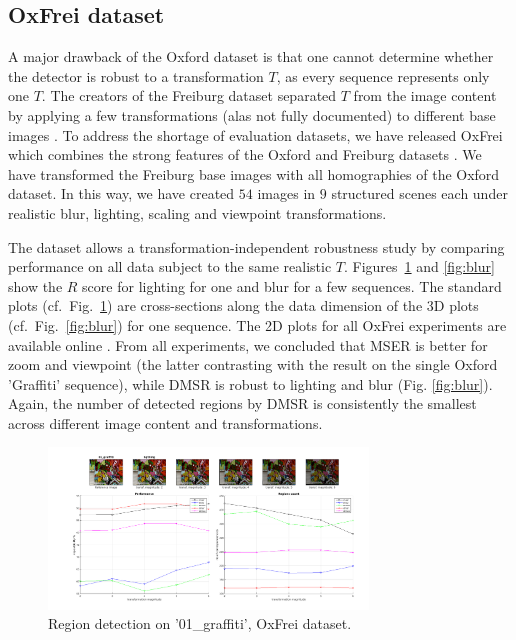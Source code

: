 \documentclass[conference,compsoc]{IEEEtran}
\begin{document}
\subsection{OxFrei dataset}
\label{ssec:combined}
A major drawback of the Oxford dataset is that one cannot determine whether the detector is robust to a transformation $T$, as every sequence represents only one $T$. The creators of the Freiburg dataset separated $T$ from the image content by applying a few transformations (alas not fully documented) to different base images \cite{FischerDB14}. To address the shortage of evaluation datasets, we have released OxFrei which combines the strong features of the Oxford and Freiburg datasets \cite{elena_ranguelova_2016_45156}. We have transformed the Freiburg base images with all homographies of the Oxford dataset. In this way, we have created $54$ images in $9$ structured scenes each under realistic blur, lighting, scaling and viewpoint transformations.

The dataset allows a transformation-independent robustness study by comparing performance on all data subject to the same realistic $T$. Figures~\ref{fig:det_frei} and \ref{fig:blur} show the $R$ score for lighting for one and blur for a few sequences. The standard plots (cf.~Fig.~\ref{fig:det_frei}) are cross-sections along the data dimension of the 3D plots (cf.~Fig.~\ref{fig:blur}) for one sequence. The 2D plots for all OxFrei experiments are available online \cite{elena_ranguelova_2016_45156}. From all experiments, we concluded that MSER is better for zoom and viewpoint (the latter contrasting with the result on the single Oxford 'Graffiti' sequence), while DMSR is robust to lighting and blur (Fig. \ref{fig:blur}). Again, the number of detected regions by DMSR is consistently the smallest across different image content and transformations.

\begin{figure}[htb]
\centering
\begin{minipage}[b]{.99\linewidth}
  \centering
 \centerline{\includegraphics[width=8.5cm]{repeatability_all_combined_01_graffiti_ligthing_good}}
\end{minipage}
\hfill
\caption{Region detection on '01\_graffiti', OxFrei dataset.}
\label{fig:det_frei}
%
\end{figure}
\end{document}
